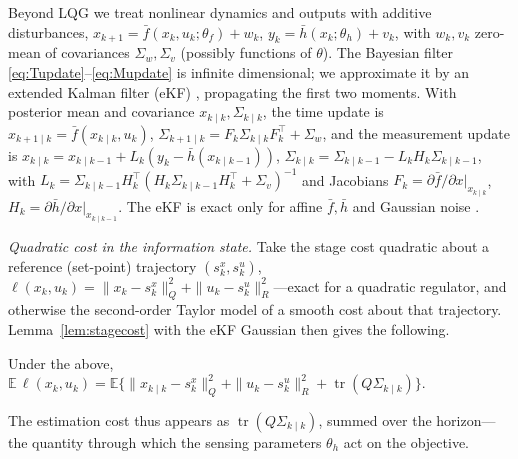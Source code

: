 \documentclass[twocolumn,amsthm]{autart}
\begin{document}
Beyond LQG we treat nonlinear dynamics and outputs with additive disturbances,
$x_{k+1} = \bar f(x_k,u_k;\theta_f) + w_k$, $y_k = \bar h(x_k;\theta_h) + v_k$,
with $w_k, v_k$ zero-mean of covariances $\Sigma_w, \Sigma_v$ (possibly functions
of $\theta$). The Bayesian filter
\eqref{eq:Tupdate}--\eqref{eq:Mupdate} is infinite dimensional; we approximate it
by an extended Kalman filter (eKF) \cite{anderson2012optimal,ramadan2024extended},
propagating the first two moments. With posterior mean and covariance
$x_{k\mid k}, \Sigma_{k\mid k}$, the time update is
$x_{k+1\mid k} = \bar f(x_{k\mid k},u_k)$,
$\Sigma_{k+1\mid k} = F_k \Sigma_{k\mid k} F_k^\top + \Sigma_w$, and the
measurement update is
$x_{k\mid k} = x_{k\mid k-1} + L_k(y_k - \bar h(x_{k\mid k-1}))$,
$\Sigma_{k\mid k} = \Sigma_{k\mid k-1} - L_k H_k \Sigma_{k\mid k-1}$, with
$L_k = \Sigma_{k\mid k-1} H_k^\top (H_k \Sigma_{k\mid k-1} H_k^\top +
\Sigma_v)^{-1}$ and Jacobians
$F_k = \partial \bar f/\partial x |_{x_{k\mid k}}$,
$H_k = \partial \bar h/\partial x |_{x_{k\mid k-1}}$. The eKF is exact only for
affine $\bar f, \bar h$ and Gaussian noise \cite{anderson2012optimal}.

\emph{Quadratic cost in the information state.} Take the stage cost quadratic
about a reference (set-point) trajectory $(s_k^x,s_k^u)$,
$\ell(x_k,u_k) = \|x_k - s_k^x\|_Q^2 + \|u_k - s_k^u\|_R^2$---exact for a
quadratic regulator, and otherwise the second-order Taylor model of a smooth
cost about that trajectory. Lemma~\ref{lem:stagecost} with the eKF Gaussian then
gives the following.

\begin{lem}\label{lem:ekfcost}
Under the above, $\mathbb{E}\,\ell(x_k,u_k) = \mathbb{E}\{
\|x_{k\mid k} - s_k^x\|_Q^2 + \|u_k - s_k^u\|_R^2 +
\operatorname{tr}(Q\Sigma_{k\mid k})\}$.
\end{lem}

The estimation cost thus appears as $\operatorname{tr}(Q\Sigma_{k\mid k})$,
summed over the horizon---the quantity through which the sensing parameters
$\theta_h$ act on the objective.
\end{document}

